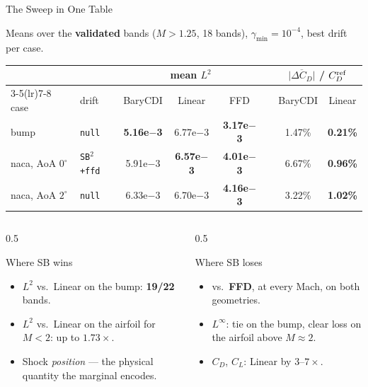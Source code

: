 \documentclass[aspectratio=169]{beamer}
\newcommand{\win}[1]{\textcolor{green!55!black}{\textbf{#1}}}
\newcommand{\lose}[1]{\textcolor{red!75!black}{#1}}
\begin{document}
\begin{frame}{The Sweep in One Table}

\footnotesize
Means over the \textbf{validated} bands ($M>1.25$, 18 bands), $\gamma_{\min}=10^{-4}$,
best drift per case.

\begin{center}
\begin{tabular}{@{}llccc c cc@{}}
\toprule
 & & \multicolumn{3}{c}{mean $L^2$} & & \multicolumn{2}{c}{$\overline{|\Delta C_D|}$ / $C_D^{\rm ref}$} \\
\cmidrule(lr){3-5}\cmidrule(lr){7-8}
case & drift & BaryCDI & Linear & FFD & & BaryCDI & Linear \\
\midrule
bump             & \texttt{null}       & \win{5.16e$-$3} & 6.77e$-$3 & \textbf{3.17e$-$3} & & \lose{1.47\%} & \textbf{0.21\%} \\
naca, AoA $0^\circ$ & \texttt{SB}$^2$\texttt{+ffd} & \lose{5.91e$-$3} & \textbf{6.57e$-$3} & \textbf{4.01e$-$3} & & \lose{6.67\%} & \textbf{0.96\%} \\
naca, AoA $2^\circ$ & \texttt{null}       & \lose{6.33e$-$3} & 6.70e$-$3 & \textbf{4.16e$-$3} & & \lose{3.22\%} & \textbf{1.02\%} \\
\bottomrule
\end{tabular}
\end{center}

\begin{columns}[T]
\begin{column}{0.5\textwidth}
\begin{block}{Where SB wins}
\begin{itemize}\small
    \item $L^2$ vs.\ Linear on the bump: \win{19/22} bands.
    \item $L^2$ vs.\ Linear on the airfoil for $M<2$: up to \win{$1.73\times$}.
    \item Shock \emph{position} — the physical quantity the marginal encodes.
\end{itemize}
\end{block}
\end{column}
\begin{column}{0.5\textwidth}
\begin{block}{Where SB loses}
\begin{itemize}\small
    \item vs.\ \textbf{FFD}, at every Mach, on both geometries.
    \item $L^\infty$: tie on the bump, clear loss on the airfoil above $M\approx2$.
    \item $C_D$, $C_L$: Linear by $3$--$7\times$.
\end{itemize}
\end{block}
\end{column}
\end{columns}

\end{frame}
\end{document}
